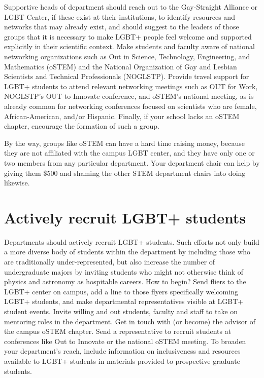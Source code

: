Supportive heads of department should reach out to the Gay-Straight Alliance or LGBT Center, if these exist at their institutions, to identify resources and networks that may already exist, and should suggest to the leaders of those groups that it is necessary to make LGBT+ people feel welcome and supported explicitly in their scientific context. Make students and faculty aware of national networking organizations such as Out in Science, Technology, Engineering, and Mathematics (oSTEM) and the National Organization of Gay and Lesbian Scientists and Technical Professionals (NOGLSTP). Provide travel support for LGBT+ students to attend relevant networking meetings such as OUT for Work, NOGLSTP's OUT to Innovate conference, and oSTEM's national meeting, as is already common for networking conferences focused on scientists who are female, African-American, and/or Hispanic. Finally, if your school lacks an oSTEM chapter, encourage the formation of such a group.

By the way, groups like oSTEM  can have a hard time raising money, because they are not
affiliated with the campus LGBT center, and they have only one or two members from any particular department.  Your department chair can help by giving them \$500 and shaming the other STEM department chairs into doing likewise.


\section {Actively recruit LGBT+ students}
\label{recruit-students}
Departments should actively recruit LGBT+ students. Such efforts not only build a more diverse body of students within the department by including those who are traditionally under-represented, but also increase the number of undergraduate majors by inviting students who might not otherwise think of physics and astronomy as hospitable careers. How to begin?  Send fliers to the LGBT+ center on campus, add a line to those flyers specifically welcoming LGBT+ students, and make departmental representatives visible at LGBT+ student events.  Invite willing and out students, faculty and staff to take on mentoring roles in the department.  Get in touch with (or become) the advisor of the campus oSTEM chapter.  Send a representative to recruit students at conferences like Out to Innovate or the national oSTEM meeting.  To broaden your department's reach, include information on inclusiveness and resources available to LGBT+ students in materials provided to prospective graduate students. 

